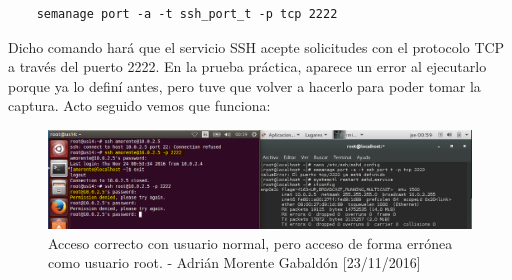 \begin{verbatim}
	semanage port -a -t ssh_port_t -p tcp 2222
\end{verbatim}
Dicho comando hará que el servicio SSH acepte solicitudes con el protocolo TCP a través del puerto 2222. En la prueba práctica, aparece un error al ejecutarlo porque ya lo definí antes, pero tuve que volver a hacerlo para poder tomar la captura. Acto seguido vemos que funciona:
\begin{figure}[H]
	\centering
	\includegraphics[scale=0.4]{ssh-port}
	\caption{Acceso correcto con usuario normal, pero acceso de forma errónea como usuario root. - Adrián Morente Gabaldón [23/11/2016]}
	\label{fig:figura21}
\end{figure}



